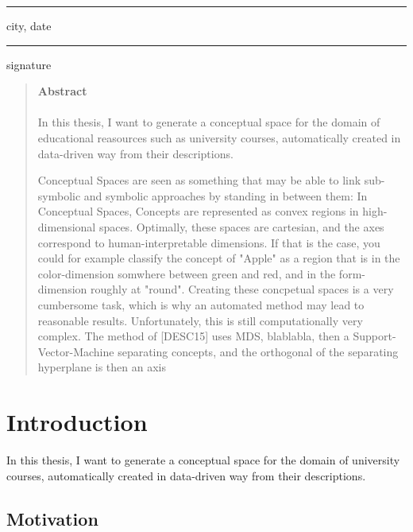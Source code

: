 \documentclass[11pt,
  paper=a4, 
  twoside,  %
  hidelinks,
  bibliography=totocnumbered,
	captions=tableheading,
	BCOR=10mm
]{scrreprt}
\theoremstyle{definition}
\newcommand{\namesigdate}[1][5cm]{%
	\vspace{5cm}
	{\setlength{\parindent}{0cm}
	\begin{minipage}{0.3\textwidth}
		\hrule 
		\vspace{0.5cm}
		{\small city, date}
	\end{minipage}
	 \hfill
	\begin{minipage}{0.3\textwidth}
		\hrule
		\vspace{0.5cm}
	    {\small signature}
	\end{minipage}
	}
}
\begin{document}
\namesigdate
{}
\pagebreak

\begin{abstract}
	\textbf{\LARGE{Abstract}}\\\\
	In this thesis, I want to generate a conceptual space for the domain of educational reasources such as university courses, automatically created in data-driven way from their descriptions.

	Conceptual Spaces are seen as something that may be able to link sub-symbolic and symbolic approaches by standing in between them: In Conceptual Spaces, Concepts are represented as convex regions in high-dimensional spaces. Optimally, these spaces are cartesian, and the axes correspond to human-interpretable dimensions. If that is the case, you could for example classify the concept of "Apple" as a region that is in the color-dimension somwhere between green and red, and in the form-dimension roughly at "round".
	Creating these concpetual spaces is a very cumbersome task, which is why an automated method may lead to reasonable results. Unfortunately, this is still computationally very complex.
	The method of [DESC15] uses MDS, blablabla, then a Support-Vector-Machine separating concepts, and the orthogonal of the separating hyperplane is then an axis
\end{abstract}




\tableofcontents
\listoffigures
\listoftables
\listofalgorithms
\lstlistoflistings %

\pagestyle{thesis}

\chapter{Introduction}


In this thesis, I want to generate a conceptual space for the domain of university courses, automatically created in data-driven way from their descriptions.

\section{Motivation}
\end{document}
